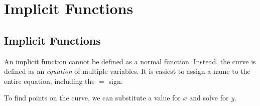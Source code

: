 \chapter{Implicit Functions}
\label{chp:implicit_functions}


\section{Implicit Functions}
\label{sec:implicit_functions_tutorial}

An implicit function cannot be defined as a normal function. Instead, the curve is defined as an \textit{equation} of multiple variables. It is easiest to assign a name to the entire equation, including the $=$ sign.

\begin{maplegroup}
\begin{mapleinput}
\end{mapleinput}
\mapleresult
\begin{maplelatex}
\end{maplelatex}
\end{maplegroup}


\noindent
To find points on the curve, we can substitute a value for $x$ and solve for $y$.

\begin{maplegroup}
\begin{mapleinput}
\end{mapleinput}
\mapleresult
\begin{maplelatex}
\end{maplelatex}
\end{maplegroup}

\begin{maplegroup}
\begin{mapleinput}
\end{mapleinput}
\mapleresult
\begin{maplelatex}
\end{maplelatex}
\end{maplegroup}

